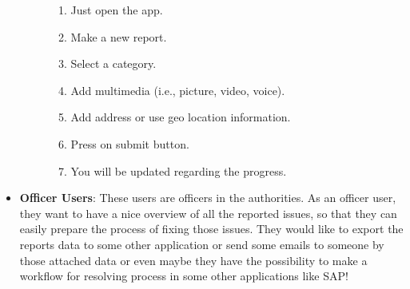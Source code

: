 \begin{itemize}
\begin{figure}[h]
\begin{minipage}{0.5\textwidth}
            \begin{enumerate}
                \item Just open the app.
                \item Make a new report.
                \item Select a category.
                \item Add multimedia (i.e., picture, video, voice).
                \item Add address or use geo location information.
                \item Press on submit button.
                \item You will be updated regarding the progress.
            \end{enumerate}
        \end{minipage}
    \end{figure}
    
    \item \textbf{Officer Users}: These users are officers in the authorities. As an officer user, they want to have a nice overview of all the reported issues, so that they can easily prepare the process of fixing those issues. They would like to export the reports data to some other application or send some emails to someone by those attached data or even maybe they have the possibility to make a workflow for resolving process in some other applications like SAP!

\end{itemize}

